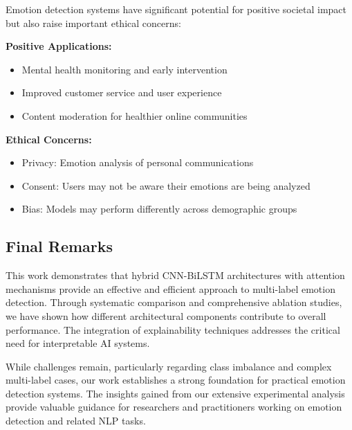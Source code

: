 \documentclass[12pt,a4paper]{article}
\begin{document}
Emotion detection systems have significant potential for positive societal impact but also raise important ethical concerns:

\textbf{Positive Applications:}
\begin{itemize}
    \item Mental health monitoring and early intervention
    \item Improved customer service and user experience
    \item Content moderation for healthier online communities
\end{itemize}

\textbf{Ethical Concerns:}
\begin{itemize}
    \item Privacy: Emotion analysis of personal communications
    \item Consent: Users may not be aware their emotions are being analyzed
    \item Bias: Models may perform differently across demographic groups
\end{itemize}

\subsection{Final Remarks}

This work demonstrates that hybrid CNN-BiLSTM architectures with attention mechanisms provide an effective and efficient approach to multi-label emotion detection. Through systematic comparison and comprehensive ablation studies, we have shown how different architectural components contribute to overall performance. The integration of explainability techniques addresses the critical need for interpretable AI systems.

While challenges remain, particularly regarding class imbalance and complex multi-label cases, our work establishes a strong foundation for practical emotion detection systems. The insights gained from our extensive experimental analysis provide valuable guidance for researchers and practitioners working on emotion detection and related NLP tasks.
\end{document}
